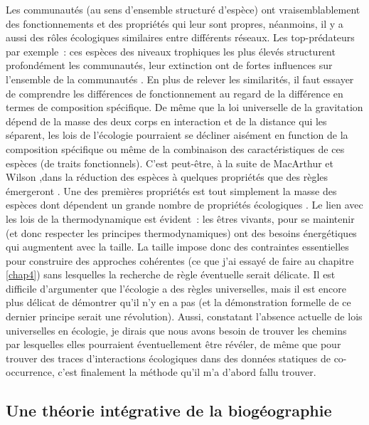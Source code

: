 Les communautés (au sens d'ensemble structuré d'espèce) ont
vraisemblablement des fonctionnements et des propriétés qui leur sont
propres, néanmoins, il y a aussi des rôles écologiques similaires entre
différents réseaux. Les top-prédateurs par exemple~: ces espèces des
niveaux trophiques les plus élevés structurent profondément les
communautés, leur extinction ont de fortes influences sur l'ensemble de
la communautés
\citep{Terborgh2001, Sinclair2003a, Myers2007, Ripple2014}. En plus de
relever les similarités, il faut essayer de comprendre les différences
de fonctionnement au regard de la différence en termes de composition
spécifique. De même que la loi universelle de la gravitation dépend de
la masse des deux corps en interaction et de la distance qui les
séparent, les lois de l'écologie pourraient se décliner aisément en
function de la composition spécifique ou même de la combinaison des
caractéristiques de ces espèces (de traits fonctionnels). C'est
peut-être, à la suite de MacArthur et Wilson \citep{MacArthur1967},dans
la réduction des espèces à quelques propriétés que des règles émergeront
\citep{McGill2006, Poisot2015}. Une des premières propriétés est tout
simplement la masse des espèces dont dépendent un grande nombre de
propriétés écologiques \citep{Woodward2005a}. Le lien avec les lois de
la thermodynamique est évident~: les êtres vivants, pour se maintenir
(et donc respecter les principes thermodynamiques) ont des besoins
énergétiques qui augmentent avec la taille. La taille impose donc des
contraintes essentielles pour construire des approches cohérentes (ce
que j'ai essayé de faire au chapitre \ref{chap4}) sans lesquelles la
recherche de règle éventuelle serait délicate. Il est difficile
d'argumenter que l'écologie a des règles universelles, mais il est
encore plus délicat de démontrer qu'il n'y en a pas (et la démonstration
formelle de ce dernier principe serait une révolution). Aussi,
constatant l'absence actuelle de lois universelles en écologie, je
dirais que nous avons besoin de trouver les chemins par lesquelles elles
pourraient éventuellement être révéler, de même que pour trouver des
traces d'interactions écologiques dans des données statiques de
co-occurrence, c'est finalement la méthode qu'il m'a d'abord fallu
trouver.

\subsection*{Une théorie intégrative de la
biogéographie}\label{une-thuxe9orie-intuxe9grative-de-la-bioguxe9ographie}

